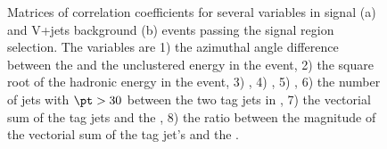 \begin{figure}
  \caption{Matrices of correlation coefficients for several variables in signal (a) and V+jets background (b) events passing the signal region selection. The variables are 1) the azimuthal angle difference between the \METnoMU and the unclustered energy in the event, 2) the square root of the hadronic energy in the event, 3) \METsig, 4) \METnoMU, 5) \Mjj, 6) the number of jets with $\pt>30$ \GeV between the two tag jets in \eta, 7) the vectorial sum of the tag jets \pt and the \METnoMU, 8) the ratio between the magnitude of the vectorial sum of the tag jet's \pt and the \METnoMU.}
  \label{fig:parkedmvacorr}
\end{figure}

